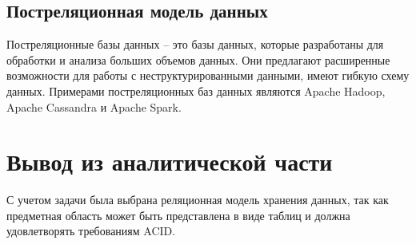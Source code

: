 \subsection*{Постреляционная модель данных}
Постреляционные базы данных -- это базы данных, которые разработаны для обработки и анализа больших объемов данных. Они предлагают расширенные возможности для работы с неструктурированными данными, имеют гибкую схему данных. Примерами постреляционных баз данных являются Apache Hadoop, Apache Cassandra и Apache Spark.

\section{Вывод из аналитической части}
С учетом задачи была выбрана реляционная модель хранения данных, так как предметная область может быть представлена в виде таблиц и должна удовлетворять требованиям ACID.
